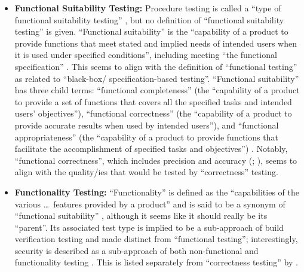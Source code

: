 \begin{itemize}
      \item \textbf{Functional Suitability Testing:} Procedure testing is
            called a ``type of functional suitability testing''
            \citep[p.~7]{IEEE2022}, but no definition of ``functional
            suitability testing'' is given. ``Functional suitability'' is the
            ``capability of a product to provide functions that meet stated and
            implied needs of intended users when it is used under specified
            conditions'', including meeting ``the functional specification''
            \citep{ISO_IEC2023a}. This seems to align with the definition of
            ``functional testing'' as related to ``black-box/
            specification-based testing''. ``Functional suitability'' has
            three child terms: ``functional completeness'' (the ``capability of
            a product to provide a set of functions that covers all the
            specified tasks and intended users' objectives''), ``functional
            correctness'' (the ``capability of a product to provide accurate
            results when used by intended users''), and ``functional
            appropriateness'' (the ``capability of a product to provide
            functions that facilitate the accomplishment of specified tasks and
            objectives'') \citep{ISO_IEC2023a}. Notably, ``functional
            correctness'', which includes precision and accuracy
            (\citealp{ISO_IEC2023a}; \citealpISTQB{}), seems to align with
            the quality/ies that would be tested by ``correctness'' testing.

      \item \textbf{Functionality Testing:} ``Functionality'' is defined as the
            ``capabilities of the various \dots\ features provided by a product''
            \citep[p.~196]{IEEE2017} and is said to be a synonym of
            ``functional suitability'' \citepISTQB{}, although it seems
            like it should really be its ``parent''. Its associated test type
            is implied to be a sub-approach of build verification testing
            \citepISTQB{} and made distinct from ``functional testing'';
            interestingly, security is described as a sub-approach of both
            non-functional and functionality testing \citep[Tab.~2]{Gerrard2000a}.
            This is listed separately from ``correctness testing'' by
            \citet[p.~53]{Firesmith2015}.
\end{itemize}

